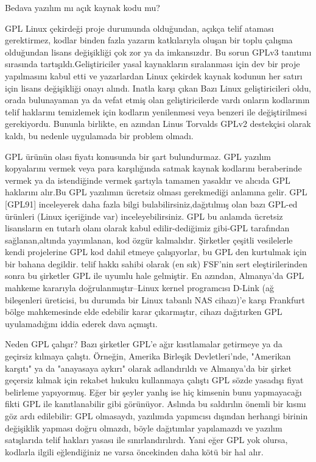 \begin{section}{Bedava yazılım mı açık kaynak kodu mu?}
\begin{subsection}{GPL}
Linux çekirdeği proje durumunda olduğundan, açıkça telif ataması gerektirmez, kodlar binden fazla yazarın katkılarıyla oluşan bir toplu çalışma  olduğundan lisans değişikliği çok zor ya da imkansızdır. Bu sorun GPLv3 tanıtımı sırasında tartışıldı.Geliştiriciler yasal kaynakların sıralanması için dev bir proje yapılmasını kabul etti ve yazarlardan Linux çekirdek kaynak kodunun her satırı için lisans değişikliği onayı alındı. Inatla karşı çıkan Bazı Linux geliştiricileri oldu, orada bulunayaman ya da vefat etmiş olan geliştiricilerde vardı onların kodlarının telif haklarını temizlemek için kodların yenilenmesi veya benzeri ile değiştirilmesi gerekiyordu. Bununla birlikte, en azından Linus Torvalds GPLv2  destekçisi olarak kaldı, bu nedenle uygulamada bir problem olmadı.

GPL ürünün olası fiyatı konusunda bir şart bulundurmaz. GPL yazılım kopyalarını vermek veya para karşılığında satmak kaynak kodlarını beraberinde vermek ya da istendiğinde vermek şartıyla tamamen yasaldır ve alıcıda GPL haklarını alır.Bu GPL yazılımın ücretsiz olması gerekmediği anlamına gelir. GPL [GPL91] inceleyerek daha fazla bilgi bulabilirsiniz,dağıtılmış olan bazı  GPL-ed ürünleri (Linux içeriğinde var) inceleyebilirsiniz. GPL  bu anlamda ücretsiz lisansların en tutarlı olanı olarak kabul edilir-dediğimiz gibi-GPL tarafından sağlanan,altında yayımlanan, kod  özgür kalmalıdır. Şirketler çeşitli vesilelerle kendi projelerine GPL kod dahil etmeye çalışıyorlar, bu GPL den kurtulmak için bir bahana degildir. telif hakkı sahibi olarak (en sık) FSF'nin sert eleştirilerinden sonra bu şirketler GPL ile uyumlu hale gelmiştir. En azından, Almanya'da GPL mahkeme kararıyla doğrulanmıştır--Linux kernel programcısı D-Link (ağ bileşenleri üreticisi, bu durumda bir Linux tabanlı NAS cihazı)'e karşı Frankfurt bölge mahkemesinde elde edebilir karar çıkarmıştır, cihazı dağıtırken GPL uyulamadığını iddia ederek dava açmıştı.

Neden GPL çalışır? Bazı şirketler GPL'e ağır kısıtlamalar getirmeye ya da geçirsiz kılmaya çalıştı. Örneğin, Amerika Birleşik Devletleri'nde, "Amerikan karşıtı" ya da "anayasaya aykırı" olarak adlandırıldı ve Almanya'da bir şirket geçersiz kılmak için rekabet hukuku kullanmaya çalıştı GPL sözde yasadışı fiyat belirleme yapıyormuş. Eğer bir şeyler yanlış ise hiç kimsenin bunu yapmayacağı fikti GPL ile kanıtlanabilir gibi görünüyor. Aslında bu saldırılın önemli bir kısmı göz ardı edilebilir: GPL olmasaydı, yazılımda yapımcısı dışından herhangi birinin değişiklik yapması doğru olmazdı, böyle dağıtımlar yapılamazdı ve yazılım satışlarıda telif hakları yasası ile sınırlandırılırdı. Yani eğer GPL yok olursa, kodlarla ilgili eğlendiğiniz ne varsa öncekinden daha kötü bir hal alır.


\end{subsection}
\end{section}
